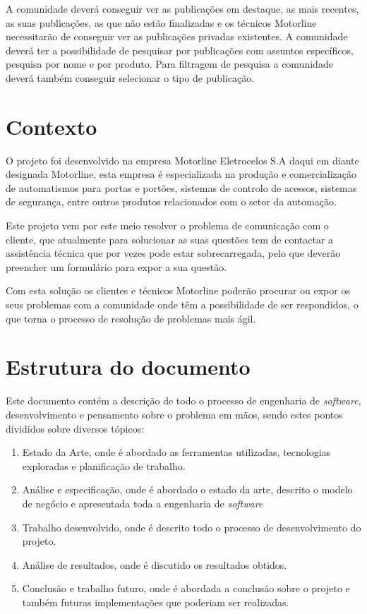 A comunidade deverá conseguir ver as publicações em destaque, as mais recentes, as suas publicações, as que não estão finalizadas e os técnicos Motorline necessitarão de conseguir ver as publicações privadas existentes. A comunidade deverá ter a possibilidade de pesquisar por publicações com assuntos específicos, pesquisa por nome e por produto. Para filtragem de pesquisa a comunidade deverá também conseguir selecionar o tipo de publicação.

\section{Contexto}
O projeto foi desenvolvido na empresa Motorline Eletrocelos S.A daqui em diante designada Motorline, esta empresa é especializada na produção e comercialização de automatismos para portas e portões, sistemas de controlo de acessos, sistemas de segurança, entre outros produtos relacionados com o setor da automação.

Este projeto vem por este meio resolver o problema de comunicação com o cliente, que atualmente para solucionar as suas questões tem de contactar a assistência técnica que por vezes pode estar sobrecarregada, pelo que deverão preencher um formulário para expor a sua questão.

Com esta solução os clientes e técnicos Motorline poderão procurar ou expor os seus problemas com a comunidade onde têm a possibilidade de ser respondidos, o que torna o processo de resolução de problemas mais ágil.

\newpage
\section{Estrutura do documento}

Este documento contém a descrição de todo o processo de engenharia de \textit{software}, desenvolvimento e pensamento sobre o problema em mãos, sendo estes pontos divididos sobre diversos tópicos:
\begin{enumerate}
    \item Estado da Arte, onde é abordado as ferramentas utilizadas, tecnologias exploradas e planificação de trabalho.
    \item Análise e especificação, onde é abordado o estado da arte, descrito o modelo de negócio e apresentada toda a engenharia de \textit{software}
    \item Trabalho desenvolvido, onde é descrito todo o processo de desenvolvimento do projeto.
    \item Análise de resultados, onde é discutido os resultados obtidos.
    \item Conclusão e trabalho futuro, onde é abordada a conclusão sobre o projeto e também futuras implementações que poderiam ser realizadas.
\end{enumerate}